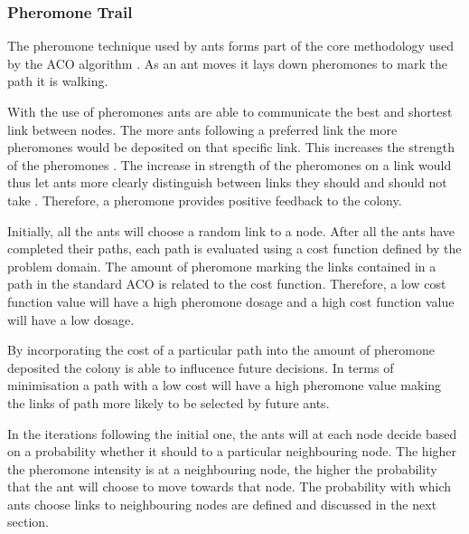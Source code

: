 \subsubsection{Pheromone Trail}
\label{sec:pheromonetrail}
The pheromone technique used by ants forms part of the core methodology used by the \gls{ACO} algorithm \cite{AntQAP}. As an ant moves it lays down pheromones to mark the path it is walking.

With the use of pheromones ants are able to communicate the best and shortest link between nodes\cite{AntQAP,AntsAndStigmergy,CompuIntelligenceIntro}. The more ants following a preferred link the more pheromones would be deposited on that specific link. This increases the strength of the pheromones \cite{ImpACOComplex}. The increase in strength of the pheromones on a link would thus let ants more clearly distinguish between links they should and should not take \cite{ImpACOComplex}. Therefore, a pheromone provides positive feedback to the colony\cite{AntQAP,AntsAndStigmergy,CompuIntelligenceIntro}.

Initially, all the ants will choose a random link to a node\cite{AntQAP,AntsAndStigmergy,CompuIntelligenceIntro}. After all the ants have completed their paths, each path is evaluated using a cost function defined by the problem domain\cite{CompuIntelligenceIntro}. The amount of pheromone marking the links contained in a path in the standard \gls{ACO} is related to the cost function\cite{AntQAP,AntsAndStigmergy,CompuIntelligenceIntro}. Therefore, a low cost function value will have a high pheromone dosage and a high cost function value will have a low dosage\cite{CompuIntelligenceIntro}. 

By incorporating the cost of a particular path into the amount of pheromone deposited the colony is able to influcence future decisions\cite{CompuIntelligenceIntro}. In terms of minimisation a path with a low cost will have a high pheromone value making the links of path more likely to be selected by future ants\cite{CompuIntelligenceIntro}.

In the iterations following the initial one, the ants will at each node decide based on a probability whether it should to a particular neighbouring node. The higher the pheromone intensity is at a neighbouring node, the higher the probability that the ant will choose to move towards that node\cite{AntQAP,AntsAndStigmergy,CompuIntelligenceIntro}. The probability with which ants choose links to neighbouring nodes are defined and discussed in the next section.

